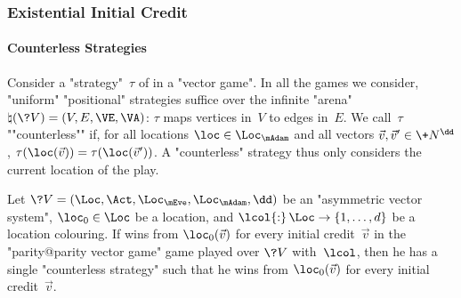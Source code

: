 \subsubsection{Existential Initial Credit}
\label{11-subsec:up-exist}

\paragraph{Counterless Strategies}
Consider a "strategy"~$\tau$ of \Adam in a "vector game".  In all the
games we consider, "uniform" "positional" strategies suffice over the
infinite "arena" $\natural(\?V)=(V,E,\VE,\VA)$: $\tau$ maps vertices
in~$V$ to edges in~$E$.  We call~$\tau$ ""counterless"" if, for all
locations $\loc\in\Loc_\mAdam$ and all vectors
$\vec v,\vec v'\in\+N^\dd$, $\tau(\loc(\vec v))=\tau(\loc(\vec v'))$.
A "counterless" strategy thus only considers the current location of
the play.
\begin{lemma}\label{11-counterless}
  Let $\?V=(\Loc,\Act,\Loc_\mEve,\Loc_\mAdam,\dd)$ be an "asymmetric
  vector system", $\loc_0\in\Loc$ be a location, and
  $\lcol{:}\,\Loc\to\{1,\dots,d\}$ be a location colouring.  If \Adam
  wins from $\loc_0(\vec v)$ for every initial credit~$\vec v$ in the
  "parity@parity vector game" game played over $\?V$ with~$\lcol$, then
  he has a single "counterless strategy" such that he wins from
  $\loc_0(\vec v)$ for every initial credit~$\vec v$.
\end{lemma}
